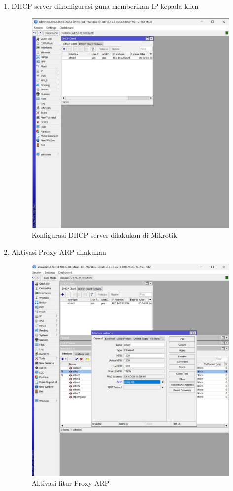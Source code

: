 \begin{enumerate}
    \item DHCP server dikonfigurasi guna memberikan IP kepada klien
    \begin{figure}[H]
        \centering
        \includegraphics[width=0.5\linewidth]{P1/img/gambar5.jpeg}
        \caption{Konfigurasi DHCP server dilakukan di Mikrotik}
        \label{fig:DHCP-server-mikrotik}
    \end{figure}
    
    \item Aktivasi Proxy ARP dilakukan
    \begin{figure}[H]
        \centering
        \includegraphics[width=0.5\linewidth]{P1/img/gambar6.jpeg}
        \caption{Aktivasi fitur Proxy ARP}
        \label{fig:Proxy-ARP}
    \end{figure}
    

\end{enumerate}
